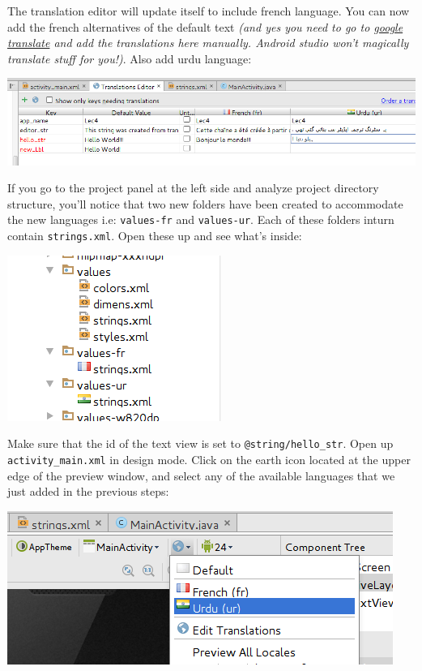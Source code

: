 The translation editor will update itself to include french language. You can now add the french alternatives of the default text \textit{(and yes you need to go to \href{https://www.google.com/search?q=google+translate&ie=utf-8&oe=utf-8}{google translate} and add the translations here manually. Android studio won't magically translate stuff for you!)}. Also add urdu language:

\begin{center}
	\includegraphics[scale=0.4]{chapters/ch04/images/17}
\end{center}

If you go to the project panel at the left side and analyze project directory structure, you'll notice that two new folders have been created to accommodate the new languages i.e: \texttt{values-fr} and \texttt{values-ur}. Each of these folders inturn contain \texttt{strings.xml}. Open these up and see what's inside:

\begin{center}
	\includegraphics[scale=0.4]{chapters/ch04/images/18}
\end{center}

Make sure that the id of the text view is set to \texttt{@string/hello\_str}. Open up \texttt{activity\_main.xml} in design mode. Click on the earth icon located at the upper edge of the preview window, and select any of the available languages that we just added in the previous steps:

\begin{center}
	\includegraphics[scale=0.4]{chapters/ch04/images/19}
\end{center}

